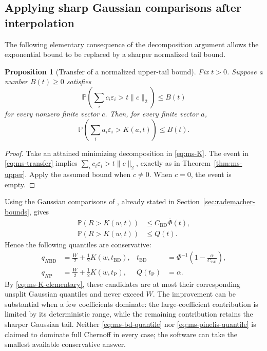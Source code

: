\documentclass[11pt,letterpaper]{article}
\numberwithin{equation}{section}
\newtheorem{proposition}[theorem]{Proposition}
\theoremstyle{definition}
\theoremstyle{remark}
\begin{document}
\subsection{Applying sharp Gaussian comparisons after interpolation}

The following elementary consequence of the decomposition argument allows
the exponential bound to be replaced by a sharper normalized tail bound.

\par\noindent\begin{minipage}{\linewidth}
\begin{proposition}[Transfer of a normalized upper-tail bound]
\label{prop:ms-transfer}
Fix $t>0$. Suppose a number $B(t)\ge0$ satisfies
\[
 \mathbb P\left(\sum_i c_i\varepsilon_i>t\|c\|_2\right)
 \le B(t)
\]
for every nonzero finite vector $c$. Then, for every finite vector $a$,
\begin{equation}
 \mathbb P\left(\sum_i a_i\varepsilon_i>K(a,t)\right)
 \le B(t).
 \label{eq:ms-transfer}
\end{equation}
\end{proposition}
\end{minipage}\par
\begin{proof}
Take an attained minimizing decomposition in \eqref{eq:ms-K}.
The event in \eqref{eq:ms-transfer} implies
$\sum_i c_i\varepsilon_i>t\|c\|_2$, exactly as in
Theorem~\ref{thm:ms-upper}. Apply the assumed bound when $c\ne0$.
When $c=0$, the event is empty.
\end{proof}

Using the Gaussian comparisons of
\cite{bentkusdzindzalieta2015,pinelis2012}, already stated in
Section~\ref{sec:rademacher-bounds}, gives
\begin{align}
 \mathbb P(R>K(w,t))&\le C_{\mathrm{BD}}\overline\Phi(t),
       \label{eq:ms-bd-tail}\\
 \mathbb P(R>K(w,t))&\le Q(t).
       \label{eq:ms-pinelis-tail}
\end{align}
Hence the following quantiles are conservative:
\begin{align}
 q_{K\mathrm{BD}}
   &=\frac W2+\frac12K(w,t_{\mathrm{BD}}),&
 t_{\mathrm{BD}}&=\Phi^{-1}\left(1-\frac\alpha{C_{\mathrm{BD}}}\right),
       \label{eq:ms-bd-quantile}\\
 q_{K\mathrm P}
   &=\frac W2+\frac12K(w,t_{\mathrm P}),&
 Q(t_{\mathrm P})&=\alpha.
       \label{eq:ms-pinelis-quantile}
\end{align}
By \eqref{eq:ms-K-elementary}, these candidates are at most their
corresponding unsplit Gaussian quantiles and never exceed $W$.
The improvement can be substantial when a few coefficients dominate:
the large-coefficient contribution is limited by its deterministic range,
while the remaining contribution retains the sharper Gaussian tail.
Neither \eqref{eq:ms-bd-quantile} nor
\eqref{eq:ms-pinelis-quantile} is claimed to dominate full Chernoff in every
case; the software can take the smallest available conservative answer.
\end{document}
